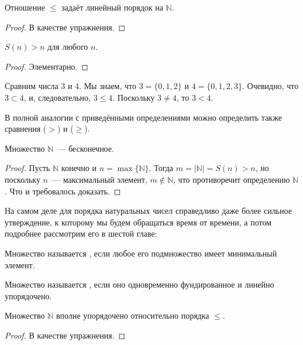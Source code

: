 \begin{thm}
Отношение $\le$ задаёт линейный порядок на $\mathbb{N}$.
\end{thm}
\begin{proof}В качестве упражнения.\end{proof}

\begin{thm}
$S(n) > n$ для любого $n$.
\end{thm}
\begin{proof}
Элементарно.
\end{proof}

\begin{example}
Сравним числа 3 и 4. Мы знаем, что $3 = \{0, 1, 2\}$ и $4 = \{0, 1, 2, 3\}$. Очевидно, что $3\subset 4$, и, следовательно, $3\le4$. Поскольку $3\not= 4$, то $3<4$.
\end{example}

В полной аналогии с приведёнными определениями можно определить также сравнения  ($>$) и  ($\ge$).

\begin{thm}
Множество $\mathbb{N}$~--- бесконечное.
\end{thm}
\begin{proof}
Пусть $\mathbb{N}$ конечно и $n = \max\{\mathbb{N}\}$. Тогда $m = |\mathbb{N}| = S(n) > n$, но поскольку $n$~--- максимальный элемент, $m\not\in\mathbb{N}$, что противоречит определению $\mathbb{N}$. Что и требовалось доказать.
\end{proof}

На самом деле для порядка натуральных чисел справедливо даже более сильное утверждение, к которому мы будем обращаться время от времени, а потом подробнее рассмотрим его в шестой главе:

\begin{definition}
Множество называется , если любое его подмножество имеет минимальный элемент.
\end{definition}

\begin{definition}
Множество называется , если оно одновременно фундированное и линейно упорядочено.
\end{definition}

\begin{thm}
Множество $\mathbb{N}$ вполне упорядочено относительно порядка $\le$.
\end{thm}
\begin{proof}
В качестве упражнения.
\end{proof}

